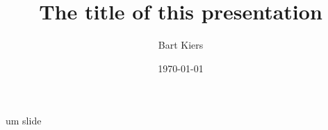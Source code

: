 \documentclass{beamer}
\title{The title of this presentation}
\author{Bart Kiers}
\date{\today}
\begin{document}
  \frame{\titlepage}
  
  \begin{frame}
  	um slide
  \end{frame}
\end{document}
